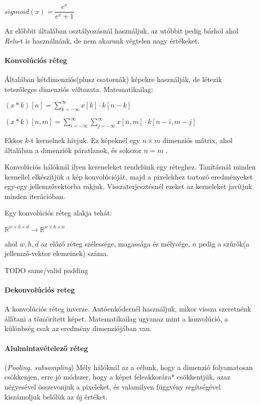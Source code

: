 $ sigmoid(x) = \dfrac{e^x}{e^x + 1} $

\noindent
Az előbbit általában osztályozásnál használjuk, az utóbbit pedig 
bárhol ahol \textit{Relu}-t is használnánk, de nem akarunk végtelen 
nagy értékeket.



\paragraph{Konvolúciós réteg} Általában kétdimenziós(plusz csatornák) 
képekre használják, de létezik tetszőleges dimenziós változata. 
Matematikailag:


$ (x*k)[n] =  \sum\limits_{k=-\infty}^{\infty} x[k] \cdot k[n-k] $

$ (x*k)[n, m] =  
\sum\limits_{i=-\infty}^{\infty} 
\sum\limits_{j=-\infty}^{\infty} 
x[n, m] \cdot k[n-i, m-j] $

\noindent
Ekkor $ k $-t kernelnek hívjuk.
Ez képeknél egy $ n \times m $ dimenziós mátrix, 
ahol általában a dimenziók páratlanok, és sokszor $ n = m $ .


Konvolúciós hálóknál ilyen kereneleket rendelünk egy réteghez.
Tanításnál minden kernellel elkészítjük a kép konvolúcióját,
majd a pixelekhez tartozó eredményeket egy-egy jellemzővektorba rakjuk.
Visszaterjesztésnél ezeket az kerneleket javítjuk minden iterációban.

\noindent
Egy konvolúciós réteg alakja tehát:

$ \mathbb{R}^{w \times h \times d} \rightarrow \mathbb{R}^{w \times h \times n} $

\noindent
ahol $ w, h,d $ az előző réteg szélessége, magassága és mélysége, 
$ n $ pedig a szűrők(a jellemző-vektor elemeinek) száma.




TODO same/valid padding



\paragraph{Dekonvolúciós reteg}
A konvolúciós réteg inverze.
Autóenkódernél használjuk, mikor vissza szeretnénk állítani
a tömörített képet. Matematikailag ugyanaz mint a konvolúció,
a különbség csak az eredmény dimenziójában van.


\paragraph{Alulmintavételező réteg} (\textit{Pooling, subsampling})
Mély hálóknál az a célunk, hogy a dimenzió folyamatosan csökkenjen, erre 
jó módszer, hogy a képet feleakkorára* csökkentjük, azaz négyesével összevonjuk
a pixeleket, és valamilyen függvény segítségével kiszámoljuk belőlük az új értéket.


